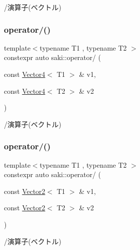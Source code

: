/演算子(ベクトル) 

\mbox{\label{namespacesaki_a32509cf81fad65763330008503395613}} 
\subsubsection{\texorpdfstring{operator/()}{operator/()}\hspace{0.1cm}{\footnotesize\ttfamily [6/8]}}
{\footnotesize\ttfamily template$<$typename T1 , typename T2 $>$ \\
constexpr auto saki\+::operator/ (\begin{DoxyParamCaption}\item[{const \mbox{\hyperlink{classsaki_1_1_vector4}{Vector4}}$<$ T1 $>$ \&}]{v1,  }\item[{const \mbox{\hyperlink{classsaki_1_1_vector4}{Vector4}}$<$ T2 $>$ \&}]{v2 }\end{DoxyParamCaption})}



/演算子(ベクトル) 

\mbox{\label{namespacesaki_a6af4b5a4a56add022ed5bfde525d5979}} 
\subsubsection{\texorpdfstring{operator/()}{operator/()}\hspace{0.1cm}{\footnotesize\ttfamily [7/8]}}
{\footnotesize\ttfamily template$<$typename T1 , typename T2 $>$ \\
constexpr auto saki\+::operator/ (\begin{DoxyParamCaption}\item[{const \mbox{\hyperlink{classsaki_1_1_vector2}{Vector2}}$<$ T1 $>$ \&}]{v1,  }\item[{const \mbox{\hyperlink{classsaki_1_1_vector2}{Vector2}}$<$ T2 $>$ \&}]{v2 }\end{DoxyParamCaption})}



/演算子(ベクトル) 

\mbox{\label{namespacesaki_af54405ace3d571365d95cfecb624c611}} 
